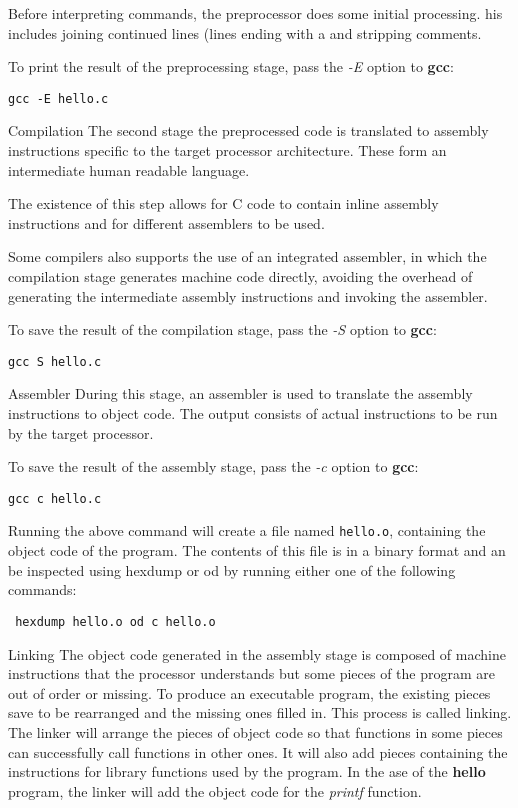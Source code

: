 \vskip 4pt \noindent
Before interpreting commands, the preprocessor does some initial processing.
his includes joining continued lines (lines ending with a \) and stripping
comments.

\vskip 4pt \noindent
To print the result of the preprocessing stage, pass the {\sl -E} option to {%
\bf gcc}:

\vskip 4pt \noindent
{\tt gcc -E hello.c}

\fi

Compilation   \hfill \break
The second stage the preprocessed code is translated to assembly instructions
specific to the target processor architecture. These form an intermediate human
readable language.

\vskip 4pt \noindent
The existence of this step allows for C code to contain inline assembly
instructions and for different assemblers to be used.

\vskip 4pt \noindent
Some compilers also supports the use of an integrated assembler, in which the
compilation stage generates machine code directly, avoiding the overhead of
generating the intermediate assembly instructions and invoking the assembler.

\vskip 4pt \noindent
To save the result of the compilation stage, pass the {\sl -S} option to {\bf
gcc}:

\vskip 4pt \noindent
{\tt gcc \-S hello.c}

\fi

Assembler   \hfill \break
During this stage, an assembler is used to translate the assembly instructions
to object code. The output consists of actual instructions to be run by the
target processor.

\vskip 4pt \noindent
To save the result of the assembly stage, pass the {\sl -c} option to {\bf
gcc}:

\vskip 4pt \noindent
{\tt gcc \-c hello.c}

\vskip 4pt \noindent
Running the above command will create a file named {\tt hello.o}, containing
the
object code of the program. The contents of this file is in a binary format and
an be inspected using hexdump or od by running either one of the following
commands:

\vskip 4pt \noindent
{\tt
hexdump hello.o
od \-c hello.o
}

\fi

Linking   \hfill \break
The object code generated in the assembly stage is composed of machine
instructions that the processor understands but some pieces of the program are
out of order or missing. To produce an executable program, the existing pieces
save to be rearranged and the missing ones filled in. This process is called
linking. The linker will arrange the pieces of object code so that functions in
some pieces can successfully call functions in other ones. It will also add
pieces containing the instructions for library functions used by the program.
In the ase of the {\bf hello} program, the linker will add the object code for
the {\sl printf} function.

